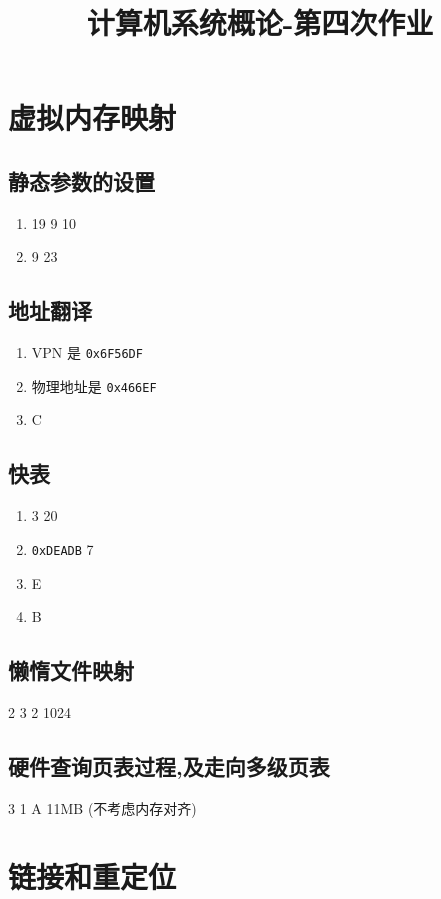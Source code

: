 
\usepackage{../../homeworks_preamble}
\title{计算机系统概论-第四次作业}


    \maketitle
    \section{虚拟内存映射}
    \subsection{静态参数的设置}
    \begin{enumerate}
        \item 19 9 10
        \item 9 23
    \end{enumerate}
    \subsection{地址翻译}
    \begin{enumerate}
        \item VPN 是 \texttt{0x6F56DF}
        \item 物理地址是 \texttt{0x466EF}
        \item C
    \end{enumerate}
    \subsection{快表}
    \begin{enumerate}
        \item 3 20
        \item \texttt{0xDEADB} 7
        \item E
        \item B
    \end{enumerate}
    \subsection{懒惰文件映射}
    2 3 2 1024
    \subsection{硬件查询页表过程,及走向多级页表}
    3 1 A 11MB (不考虑内存对齐)
    \section{链接和重定位}
